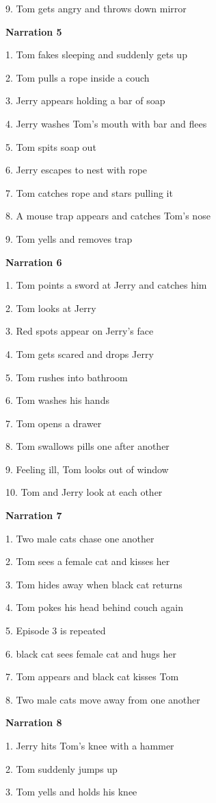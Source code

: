 \documentclass[review]{elsarticle} %
\begin{document}
9. Tom gets angry and throws down mirror

\textbf{Narration 5}

1. Tom fakes sleeping and suddenly gets up

2. Tom pulls a rope inside a couch

3. Jerry appears holding a bar of soap

4. Jerry washes Tom's mouth with bar and flees

5. Tom spits soap out

6. Jerry escapes to nest with rope

7. Tom catches rope and stars pulling it

8. A mouse trap appears and catches Tom's nose

9. Tom yells and removes trap

\textbf{Narration 6}

1. Tom points a sword at Jerry and catches him

2. Tom looks at Jerry

3. Red spots appear on Jerry's face

4. Tom gets scared and drops Jerry

5. Tom rushes into bathroom

6. Tom washes his hands

7. Tom opens a drawer

8. Tom swallows pills one after another

9. Feeling ill, Tom looks out of window

10. Tom and Jerry look at each other

\textbf{Narration 7}

1. Two male cats chase one another

2. Tom sees a female cat and kisses her

3. Tom hides away when black cat returns

4. Tom pokes his head behind couch again

5. Episode 3 is repeated

6. black cat sees female cat and hugs her

7. Tom appears and black cat kisses Tom

8. Two male cats move away from one another

\textbf{Narration 8}

1. Jerry hits Tom's knee with a hammer

2. Tom suddenly jumps up

3. Tom yells and holds his knee
\end{document}
